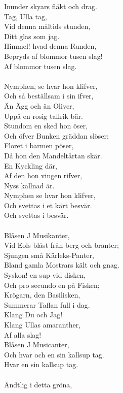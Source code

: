 Inunder skyars fläkt och drag.\\ 
Tag, Ulla tag,\\ 
Vid denna måltids stunden,\\ 
Ditt glas som jag.\\ 
Himmel! hvad denna Runden,\\ 
Bepryds af blommor tusen slag!\\ 
Af blommor tusen slag.\\ 
\\ 
Nymphen, se hvar hon klifver,\\ 
Och så beställsam i sin ifver,\\ 
Än Ägg och än Oliver,\\ 
Uppå en rosig tallrik bär.\\ 
Stundom en sked hon öser,\\ 
Och öfver Bunken gräddan slöser;\\ 
Floret i barmen pöser,\\ 
Då hon den Mandeltårtan skär.\\ 
En Kyckling där,\\ 
Af den hon vingen rifver,\\ 
Nyss kallnad är.\\ 
Nymphen se hvar hon klifver,\\ 
Och svettas i et kärt besvär.\\ 
Och svettas i besvär.\\ 
\\ 
Blåsen J Musikanter,\\ 
Vid Eols blåst från berg och branter;\\ 
Sjungen små Kärleks-Panter,\\ 
Bland gamla Mostrars kält och gnag.\\ 
Syskon! en sup vid disken,\\ 
Och pro secundo en på Fisken;\\ 
Krögarn, den Basilisken,\\ 
Summerar Taflan full i dag.\\ 
Klang Du och Jag!\\ 
Klang Ullas amaranther,\\ 
Af alla slag!\\ 
Blåsen J Musicanter,\\ 
Och hvar och en sin kallsup tag.\\ 
Hvar en sin kallsup tag.\\ 
\\ 
Ändtlig i detta gröna,\\ 
